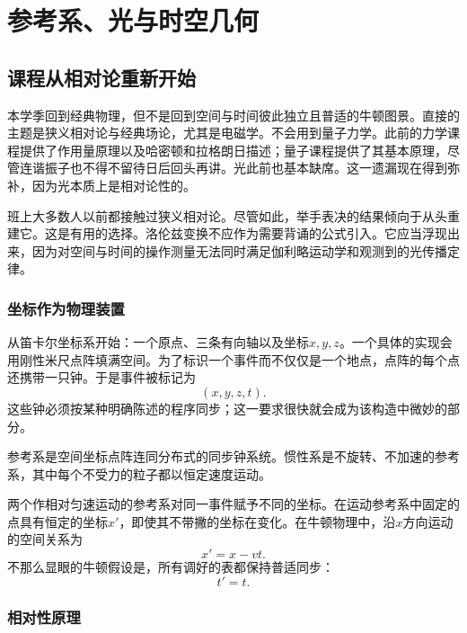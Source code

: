 \chapter{参考系、光与时空几何}

\section{课程从相对论重新开始}

本学季回到经典物理，但不是回到空间与时间彼此独立且普适的牛顿图景。直接的主题是狭义相对论与经典场论，尤其是电磁学。不会用到量子力学。此前的力学课程提供了作用量原理以及哈密顿和拉格朗日描述；量子课程提供了其基本原理，尽管连谐振子也不得不留待日后回头再讲。光此前也基本缺席。这一遗漏现在得到弥补，因为光本质上是相对论性的。

班上大多数人以前都接触过狭义相对论。尽管如此，举手表决的结果倾向于从头重建它。这是有用的选择。洛伦兹变换不应作为需要背诵的公式引入。它应当浮现出来，因为对空间与时间的操作测量无法同时满足伽利略运动学和观测到的光传播定律。

\subsection{坐标作为物理装置}

从笛卡尔坐标系开始：一个原点、三条有向轴以及坐标\(x,y,z\)。一个具体的实现会用刚性米尺点阵填满空间。为了标识一个事件而不仅仅是一个地点，点阵的每个点还携带一只钟。于是事件被标记为
\begin{equation}
(x,y,z,t).
\end{equation}
这些钟必须按某种明确陈述的程序同步；这一要求很快就会成为该构造中微妙的部分。

\begin{definition}
参考系是空间坐标点阵连同分布式的同步钟系统。惯性系是不旋转、不加速的参考系，其中每个不受力的粒子都以恒定速度运动。
\end{definition}

两个作相对匀速运动的参考系对同一事件赋予不同的坐标。在运动参考系中固定的点具有恒定的坐标\(x'\)，即使其不带撇的坐标在变化。在牛顿物理中，沿\(x\)方向运动的空间关系为
\begin{equation}
x'=x-vt.
\label{eq:sr1-galilean-space}
\end{equation}
不那么显眼的牛顿假设是，所有调好的表都保持普适同步：
\begin{equation}
t'=t.
\label{eq:sr1-absolute-time}
\end{equation}

\subsection{相对性原理}

